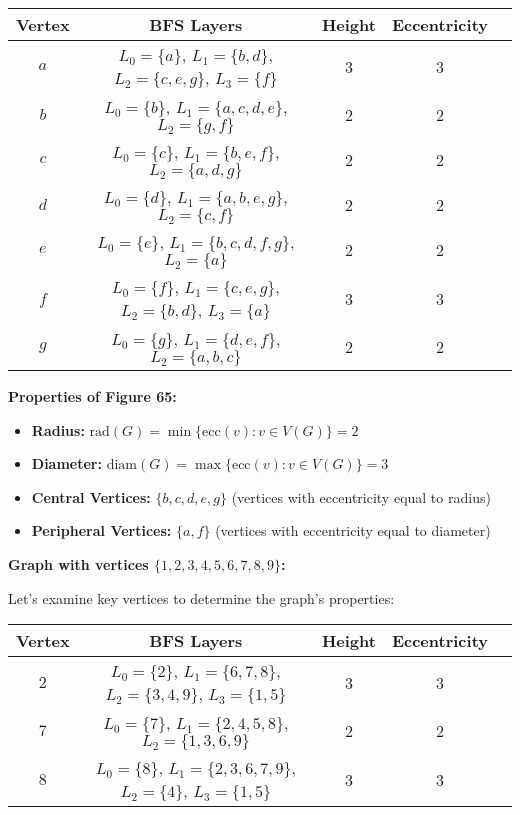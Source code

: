 \documentclass{article}
\theoremstyle{definition}
\begin{document}
\begin{center}
\begin{tabular}{|c|c|c|c|c|}
\hline
\textbf{Vertex} & \textbf{BFS Layers} & \textbf{Height} & \textbf{Eccentricity} \\
\hline
$a$ & $L_0 = \{a\}$, $L_1 = \{b, d\}$, $L_2 = \{c, e, g\}$, $L_3 = \{f\}$ & 3 & 3 \\
\hline
$b$ & $L_0 = \{b\}$, $L_1 = \{a, c, d, e\}$, $L_2 = \{g, f\}$ & 2 & 2 \\
\hline
$c$ & $L_0 = \{c\}$, $L_1 = \{b, e, f\}$, $L_2 = \{a, d, g\}$ & 2 & 2 \\
\hline
$d$ & $L_0 = \{d\}$, $L_1 = \{a, b, e, g\}$, $L_2 = \{c, f\}$ & 2 & 2 \\
\hline
$e$ & $L_0 = \{e\}$, $L_1 = \{b, c, d, f, g\}$, $L_2 = \{a\}$ & 2 & 2 \\
\hline
$f$ & $L_0 = \{f\}$, $L_1 = \{c, e, g\}$, $L_2 = \{b, d\}$, $L_3 = \{a\}$ & 3 & 3 \\
\hline
$g$ & $L_0 = \{g\}$, $L_1 = \{d, e, f\}$, $L_2 = \{a, b, c\}$ & 2 & 2 \\
\hline
\end{tabular}
\end{center}
\noindent\textbf{Properties of Figure 65:}
\begin{itemize}
\item \textbf{Radius:} $\text{rad}(G) = \min\{\text{ecc}(v) : v \in V(G)\} = 2$
\item \textbf{Diameter:} $\text{diam}(G) = \max\{\text{ecc}(v) : v \in V(G)\} = 3$
\item \textbf{Central Vertices:} $\{b, c, d, e, g\}$ (vertices with eccentricity equal to radius)
\item \textbf{Peripheral Vertices:} $\{a, f\}$ (vertices with eccentricity equal to diameter)
\end{itemize}


\noindent\textbf{Graph with vertices $\{1, 2, 3, 4, 5, 6, 7, 8, 9\}$:}

Let's examine key vertices to determine the graph's properties:

\begin{center}
\begin{tabular}{|c|c|c|c|c|}
\hline
\textbf{Vertex} & \textbf{BFS Layers} & \textbf{Height} & \textbf{Eccentricity} \\
\hline
$2$ & $L_0 = \{2\}$, $L_1 = \{6, 7, 8\}$, $L_2 = \{3, 4, 9\}$, $L_3 = \{1, 5\}$ & 3 & 3 \\
\hline
$7$ & $L_0 = \{7\}$, $L_1 = \{2, 4, 5, 8\}$, $L_2 = \{1, 3, 6, 9\}$ & 2 & 2 \\
\hline
$8$ & $L_0 = \{8\}$, $L_1 = \{2, 3, 6, 7, 9\}$, $L_2 = \{4\}$, $L_3 = \{1, 5\}$ & 3 & 3 \\
\hline
\end{tabular}
\end{center}
\end{document}
